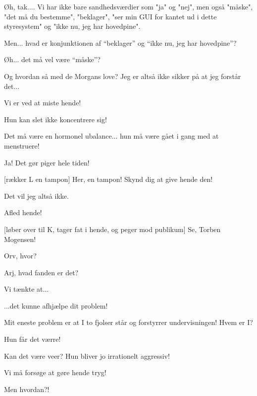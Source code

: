 \documentclass[a4paper,11pt]{article}
\begin{document}
\begin{sketch}
   Øh, tak....  Vi har ikke bare sandhedsværdier som "ja" og
  "nej", men også "måske", "det må du bestemme", "beklager", "ser min
  GUI for kantet ud i dette styresystem" og "ikke nu, jeg har
  hovedpine".

   Men... hvad er konjunktionen af "`beklager"' og "`ikke nu, jeg har hovedpine"'?

   Øh... det må vel være "`måske"'? 

   Og hvordan så med de Morgans love?  Jeg er altså ikke
  sikker på at jeg forstår det...


   Vi er ved at miste hende!

   Hun kan slet ikke koncentrere sig!

   Det må være en hormonel ubalance... hun må være gået i
  gang med at menstruere!

   Ja!  Det gør piger hele tiden!

  [rækker L en tampon] Her, en tampon!  Skynd dig at
  give hende den!

   Det vil jeg altså ikke.

   Afled hende!

  [løber over til K, tager fat i hende, og peger mod
  publikum]  Se, Torben Mogensen!

   Orv, hvor?


   Arj, hvad fanden er det?


   Vi tænkte at...

   ...det kunne afhjælpe dit problem!

   Mit eneste problem er at I to fjolser står og forstyrrer
  undervisningen!  Hvem er I?

   Hun får det værre!

   Kan det være veer?  Hun bliver jo irrationelt aggressiv!

   Vi må forsøge at gøre hende tryg!

   Men hvordan?!


\end{sketch}
\end{document}
